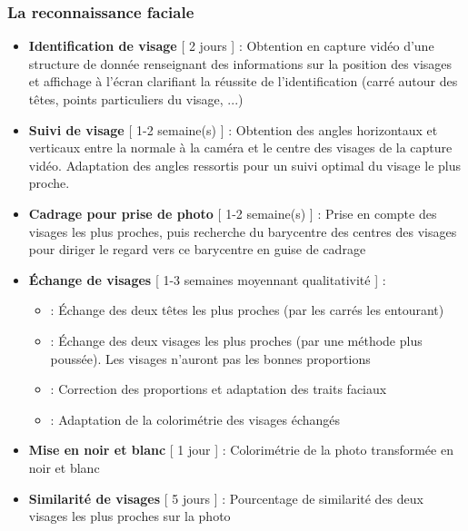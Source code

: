 \subsubsection{La reconnaissance faciale}
\begin{itemize}
    \item \textbf{Identification de visage} [ 2 jours ] : Obtention en capture vidéo d'une structure de donnée renseignant des informations sur la position des visages et affichage à l'écran clarifiant la réussite de l'identification (carré autour des têtes, points particuliers du visage, ...)
    \item \textbf{Suivi de visage} [ 1-2 semaine(s) ] : Obtention des angles horizontaux et verticaux entre la normale à la caméra et le centre des visages de la capture vidéo. Adaptation des angles ressortis pour un suivi optimal du visage le plus proche.
    \item \textbf{Cadrage pour prise de photo} [ 1-2 semaine(s) ] : Prise en compte des visages les plus proches, puis recherche du barycentre des centres des visages pour diriger le regard vers ce barycentre en guise de cadrage
    \item \textbf{Échange de visages} [ 1-3 semaines moyennant qualitativité ] :
    \begin{itemize}
        \item \indent [ 3 jours ] : Échange des deux têtes les plus proches (par les carrés les entourant)
        \item \indent [ 5 jours ] : Échange des deux visages les plus proches (par une méthode plus poussée). Les visages n'auront pas les bonnes proportions
        \item \indent [ 1 semaine ] : Correction des proportions et adaptation des traits faciaux
        \item \indent [ 5 jours ] : Adaptation de la colorimétrie des visages échangés
    \end{itemize}
    \item \textbf{Mise en noir et blanc} [ 1 jour ] : Colorimétrie de la photo transformée en noir et blanc
    \item \textbf{Similarité de visages} [ 5 jours ] : Pourcentage de similarité des deux visages les plus proches sur la photo
\end{itemize}


